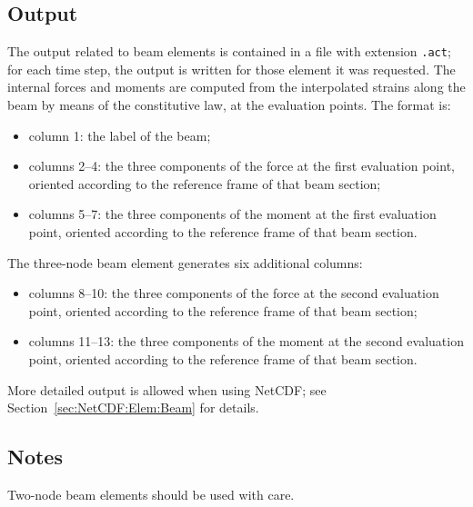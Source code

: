 \subsection{Output}
The output related to beam elements is contained in a file with extension 
\texttt{.act}; for each time step, the output is written
for those element it was requested.
The internal forces and moments are computed from the interpolated strains
along the beam by means of the constitutive law, at the evaluation points. 
The format is:
\begin{itemize}
    \item column 1: the label of the beam;
    \item columns 2--4: the three components of the force
	at the first evaluation point, oriented according
	to the reference frame of that beam section;
    \item columns 5--7: the three components of the moment
	at the first evaluation point, oriented according
	to the reference frame of that beam section.
\end{itemize}

The three-node beam element generates six additional columns:
\begin{itemize}
    \item columns 8--10: the three components of the force
	at the second evaluation point, oriented according
	to the reference frame of that beam section;
    \item columns 11--13: the three components of the moment
	at the second evaluation point, oriented according
	to the reference frame of that beam section.
\end{itemize}

More detailed output is allowed when using NetCDF;
see Section~\ref{sec:NetCDF:Elem:Beam} for details.



\subsection{Notes}
Two-node beam elements should be used with care.
